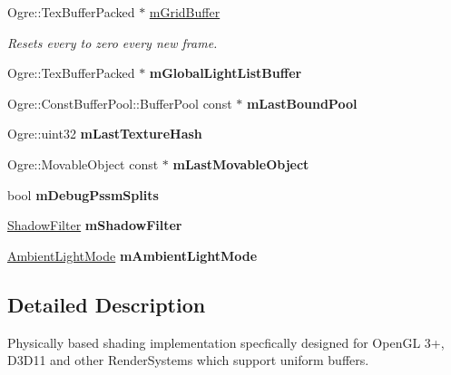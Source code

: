 \begin{DoxyCompactItemize}
\item 
\mbox{\label{class_hlms_terrain_a99e9414fb8809dc568a90eacd1262332}} 
Ogre\+::\+Tex\+Buffer\+Packed $\ast$ \hyperlink{class_hlms_terrain_a99e9414fb8809dc568a90eacd1262332}{m\+Grid\+Buffer}
\begin{DoxyCompactList}\small\item\em Resets every to zero every new frame. \end{DoxyCompactList}\item 
\mbox{\label{class_hlms_terrain_a454c753af398352343f63fbc9c8d0edb}} 
Ogre\+::\+Tex\+Buffer\+Packed $\ast$ {\bfseries m\+Global\+Light\+List\+Buffer}
\item 
\mbox{\label{class_hlms_terrain_a55e9e2a3ce773b5f0a3e1b13855ab23a}} 
Ogre\+::\+Const\+Buffer\+Pool\+::\+Buffer\+Pool const  $\ast$ {\bfseries m\+Last\+Bound\+Pool}
\item 
\mbox{\label{class_hlms_terrain_ac48005c0566ad16977dee2ef9195aae1}} 
Ogre\+::uint32 {\bfseries m\+Last\+Texture\+Hash}
\item 
\mbox{\label{class_hlms_terrain_adcae094fdd108f51f740ac91b374dd73}} 
Ogre\+::\+Movable\+Object const  $\ast$ {\bfseries m\+Last\+Movable\+Object}
\item 
\mbox{\label{class_hlms_terrain_ab7f5c27dc4285848129c777c2a496962}} 
bool {\bfseries m\+Debug\+Pssm\+Splits}
\item 
\mbox{\label{class_hlms_terrain_a5bc1f985080e7da2e202239955783a46}} 
\hyperlink{class_hlms_terrain_a241597775a6a483a2ba6cd02721d3715}{Shadow\+Filter} {\bfseries m\+Shadow\+Filter}
\item 
\mbox{\label{class_hlms_terrain_af5d508a0171c743fb005db1b76b565ec}} 
\hyperlink{class_hlms_terrain_a49e72052d5ccdc3b34459069c4496a49}{Ambient\+Light\+Mode} {\bfseries m\+Ambient\+Light\+Mode}
\end{DoxyCompactItemize}


\subsection{Detailed Description}
Physically based shading implementation specfically designed for Open\+GL 3+, D3\+D11 and other Render\+Systems which support uniform buffers. 

